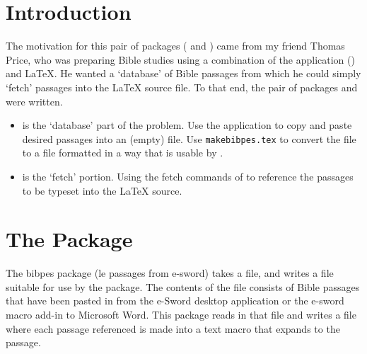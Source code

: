 \documentclass{article}
\begin{document}
\maketitle

\tableofcontents
{}


\section{Introduction}

The motivation for this pair of packages ( and )
came from my friend Thomas Price, who was preparing Bible studies using a
combination of the application 
() and \LaTeX. He wanted a `database' of Bible
passages from which he could simply `fetch' passages into the {\LaTeX} source
file. To that end, the pair of packages  and 
were written.
\begin{itemize}
    \item {} is the `database' part of the problem. Use the
         application to copy and paste desired passages into
        an (empty)  file. Use \texttt{makebibpes.tex} to convert the
         file to a  file formatted in a way that
        is usable by .

    \item {} is the `fetch' portion. Using the fetch
        commands of  to reference the passages to be
        typeset into the {\LaTeX} source.
\end{itemize}

\section{The \texorpdfstring{\protect{}}{bibpes} Package}

    The \textsf{bibpes} package (le
    \underbar passages from \underbar e-\underbar sword) takes a  file,
    and writes a  file suitable for use by the 
    package. The contents of the  file consists of Bible passages that
    have been pasted in from the \textsf{e-Sword} desktop application or the
    \textsf{e-sword} macro add-in to \textsf{Microsoft Word}. This package reads in
    that  file and writes a  file where each passage referenced
    is made into a text macro that expands to the passage.
\end{document}
